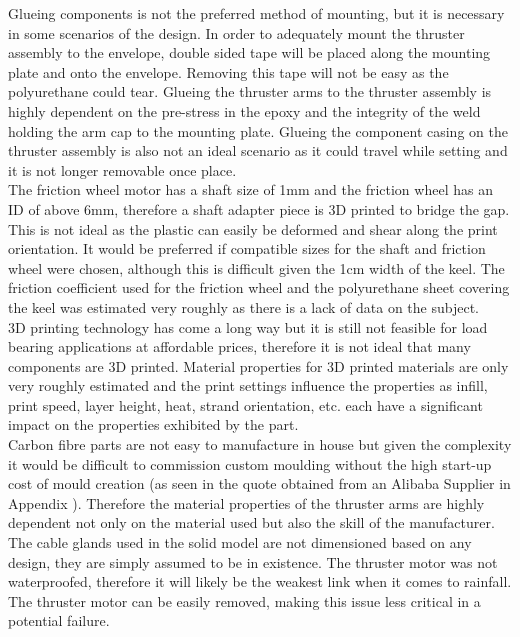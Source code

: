 \documentclass[../main.tex]{subfiles}
\begin{document}
Glueing components is not the preferred method of mounting, but it is necessary in some scenarios of the design. In order to adequately mount the thruster assembly to the envelope, double sided tape will be placed along the mounting plate and onto the envelope. Removing this tape will not be easy as the polyurethane could tear. Glueing the thruster arms to the thruster assembly is highly dependent on the pre-stress in the epoxy and the integrity of the weld holding the arm cap to the mounting plate. Glueing the component casing on the thruster assembly is also not an ideal scenario as it could travel while setting and it is not longer removable once place.\\

The friction wheel motor has a shaft size of 1mm and the friction wheel has an ID of above 6mm, therefore a shaft adapter piece is 3D printed to bridge the gap. This is not ideal as the plastic can easily be deformed and shear along the print orientation. It would be preferred if compatible sizes for the shaft and friction wheel were chosen, although this is difficult given the 1cm width of the keel. The friction coefficient used for the friction wheel and the polyurethane sheet covering the keel was estimated very roughly as there is a lack of data on the subject.\\

3D printing technology has come a long way but it is still not feasible for load bearing applications at affordable prices, therefore it is not ideal that many components are 3D printed. Material properties for 3D printed materials are only very roughly estimated and the print settings influence the properties as infill, print speed, layer height, heat, strand orientation, etc. each have a significant impact on the properties exhibited by the part.\\

Carbon fibre parts are not easy to manufacture in house but given the complexity it would be difficult to commission custom moulding without the high start-up cost of mould creation (as seen in the quote obtained from an Alibaba Supplier in Appendix \cite{KEELQUOTE}). Therefore the material properties of the thruster arms are highly dependent not only on the material used but also the skill of the manufacturer.\\

The cable glands used in the solid model are not dimensioned based on any design, they are simply assumed to be in existence. The thruster motor was not waterproofed, therefore it will likely be the weakest link when it comes to rainfall. The thruster motor can be easily removed, making this issue less critical in a potential failure. \\
\end{document}
